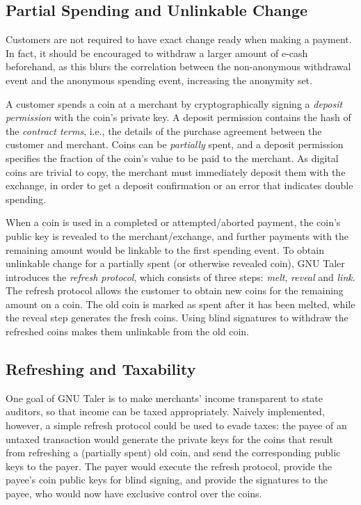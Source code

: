 \subsection{Partial Spending and Unlinkable Change}

Customers are not required to have exact change ready when making a payment.
In fact, it should be encouraged to withdraw a larger amount of e-cash
beforehand, as this blurs the correlation between the non-anonymous withdrawal
event and the anonymous spending event, increasing the anonymity set.

A customer spends a coin at a merchant by cryptographically signing a
\emph{deposit permission} with the coin's private key.  A deposit permission
contains the hash of the \emph{contract terms}, i.e., the details of the
purchase agreement between the customer and merchant. Coins can be
\emph{partially} spent, and a deposit permission specifies the fraction of the
coin's value to be paid to the merchant. As digital coins are trivial to copy,
the merchant must immediately deposit them with the exchange, in order to get a
deposit confirmation or an error that indicates double spending.

When a coin is used in a completed or attempted/aborted payment, the coin's
public key is revealed to the merchant/exchange, and further payments with the
remaining amount would be linkable to the first spending event.  To obtain
unlinkable change for a partially spent (or otherwise revealed coin), GNU
Taler introduces the \emph{refresh protocol}, which consists of three steps:
\emph{melt}, \emph{reveal} and \emph{link}.  The refresh protocol allows the
customer to obtain new coins for the remaining amount on a coin.  The old coin
is marked as spent after it has been melted, while the reveal step generates
the fresh coins.  Using blind signatures to withdraw the refreshed coins makes
them unlinkable from the old coin.


\subsection{Refreshing and Taxability}\label{sec:design-refresh}
One goal of GNU Taler is to make merchants' income transparent to state auditors,
so that income can be taxed appropriately.  Naively implemented, however, a simple
refresh protocol could be used to evade taxes:  the payee of an untaxed
transaction would generate the private keys for the coins that result from
refreshing a (partially spent) old coin, and send the corresponding public keys
to the payer.  The payer would execute the refresh protocol, provide the
payee's coin public keys for blind signing, and provide the signatures to the
payee, who would now have exclusive control over the coins.

